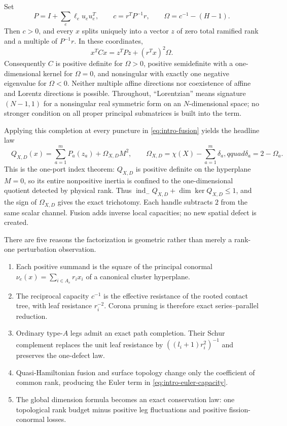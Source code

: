 \documentclass[11pt,a4paper]{amsart}
\theoremstyle{plain}
\theoremstyle{definition}
\newcommand{\indm}{\operatorname{ind}_{-}}
\begin{document}
Set
\begin{equation}\label{eq:intro-capacity}
 P=I+\sum_e\ell_eu_eu_e^T,\qquad
 c=r^TP^{-1}r,\qquad
 \Omega=c^{-1}-(H-1).
\end{equation}
Then $c>0$, and every $x$ splits uniquely into a vector $z$ of zero total ramified rank and a
multiple of $P^{-1}r$.  In these coordinates,
\begin{equation}\label{eq:intro-centered}
 x^TCx=z^TPz+(r^Tx)^2\Omega.
\end{equation}
Consequently $C$ is positive definite for $\Omega>0$, positive semidefinite with a one-dimensional
kernel for $\Omega=0$, and nonsingular with exactly one negative eigenvalue for $\Omega<0$.
Neither multiple affine directions nor coexistence of affine and Lorentz directions is possible.
Throughout, ``Lorentzian'' means signature $(N-1,1)$ for a nonsingular real symmetric form on an
$N$-dimensional space; no stronger condition on all proper principal submatrices is built into the
term.

Applying this completion at every puncture in \eqref{eq:intro-fusion} yields the headline law
\begin{equation}\label{eq:intro-euler-capacity}
 \boxed{\quad Q_{X,D}(x)=\sum_{a=1}^mP_a(z_a)+\Omega_{X,D}M^2,
 \qquad
 \Omega_{X,D}=\chi(X)-\sum_{a=1}^m\delta_a,qquad
 \delta_a=2-\Omega_a.\quad}
\end{equation}
This is the one-port index theorem: $Q_{X,D}$ is positive definite on the hyperplane $M=0$,
so its entire nonpositive inertia is confined to the one-dimensional quotient detected by physical
rank.  Thus $\indm Q_{X,D}+\dim\ker Q_{X,D}\le1$, and the sign of $\Omega_{X,D}$ gives the exact
trichotomy.  Each handle subtracts $2$ from the same scalar channel.  Fusion adds inverse local
capacities; no new spatial defect is created.

There are five reasons the factorization is geometric rather than merely a rank-one perturbation
observation.
\begin{enumerate}[label=(\roman*),leftmargin=2.2em]
\item Each positive summand is the square of the principal conormal
$\nu_e(x)=\sum_{i\in A_e}r_ix_i$ of a canonical cluster hyperplane.
\item The reciprocal capacity $c^{-1}$ is the effective resistance of the rooted contact tree,
with leaf resistance $r_i^{-2}$.  Corona pruning is therefore exact series--parallel reduction.
\item Ordinary type-$A$ legs admit an exact path completion.  Their Schur complement replaces the
unit leaf resistance by $((l_i+1)r_i^2)^{-1}$ and preserves the one-defect law.
\item Quasi-Hamiltonian fusion and surface topology change only the coefficient of common rank,
producing the Euler term in \eqref{eq:intro-euler-capacity}.
\item The global dimension formula becomes an exact conservation law: one topological rank budget
minus positive leg fluctuations and positive fission-conormal losses.
\end{enumerate}
\end{document}
